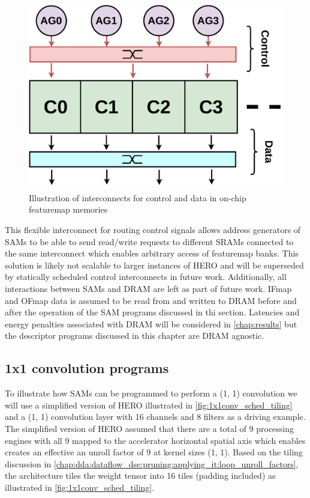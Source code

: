 \begin{figure}[ht]
    \centering
    \includegraphics[scale=0.3]{fig/interconnect.pdf}
    \caption{Illustration of interconnects for control and data in on-chip featuremap memories}
    \label{fig:interconnect}
\end{figure}


This flexible interconnect for routing control signals
allows address generators of SAMs to be able to send read/write requests to
different SRAMs connected to the same interconnect which enables arbitrary
access of featuremap banks. This solution is likely not scalable to larger
instances of HERO and will be superseded by statically scheduled control
interconnects in future work. 
Additionally, all interactions between SAMs and DRAM are left as part of future
work. IFmap and OFmap data is assumed to be read from and written to DRAM before
and after the operation of the SAM programs discussed in thi section. Latencies
and energy penalties associated with DRAM will be considered in
\autoref{chap:results} but the descriptor programs discussed in this chapter are
DRAM agnostic.

\subsection{1x1 convolution programs}
\label{chap:sams:acc_scheduling:1x1}


To illustrate how SAMs can be programmed to perform a (1, 1) convolution we will
use a simplified version of HERO illustrated in \autoref{fig:1x1conv_sched_tiling} and a (1, 1) convolution
layer with 16 channels and 8 filters as a driving example. The simplified
version of HERO assumed that there are a total of 9 processing engines with all 9
mapped to the accelerator horizontal spatial axis which enables creates an
effective an unroll factor of 9 at kernel sizes (1, 1). Based on the tiling
discussion in
\autoref{chap:dda:dataflow_dse:pruning:applying_it:loop_unroll_factors}, the
architecture tiles the weight tensor into 16 tiles (padding included) as
illustrated in \autoref{fig:1x1conv_sched_tiling}.

